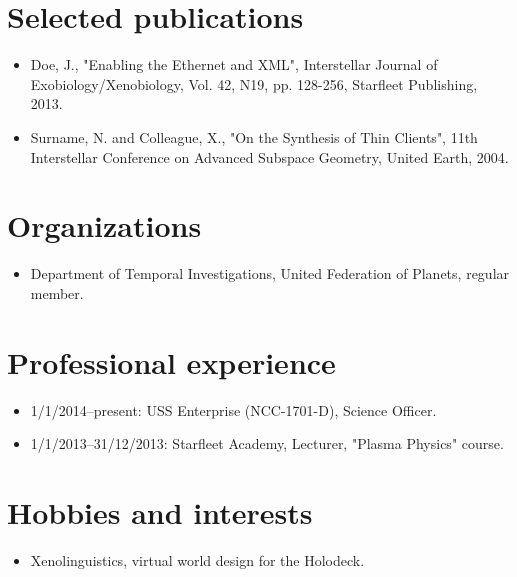 \documentclass[10pt]{article}
\begin{document}
\section*{Selected publications}

\begin{itemize}
  \item Doe, J., "Enabling the Ethernet and XML", Interstellar Journal of  Exobiology/Xenobiology, Vol. 42, N19, pp. 128-256, Starfleet Publishing, 2013.
  \item Surname, N. and Colleague, X., "On the Synthesis of Thin Clients", 11th Interstellar Conference on Advanced Subspace Geometry, United Earth, 2004.
\end{itemize}

\section*{Organizations}

\begin{itemize}
  \item Department of Temporal Investigations, United Federation of Planets, regular member.
\end{itemize}

\section*{Professional experience}

\begin{itemize}
  \item 1/1/2014--present: USS Enterprise (NCC-1701-D), Science Officer.
  \item 1/1/2013--31/12/2013: Starfleet Academy, Lecturer, "Plasma Physics" course.
\end{itemize}

\section*{Hobbies and interests}

\begin{itemize}
  \item Xenolinguistics, virtual world design for the Holodeck.
\end{itemize}
\end{document}
